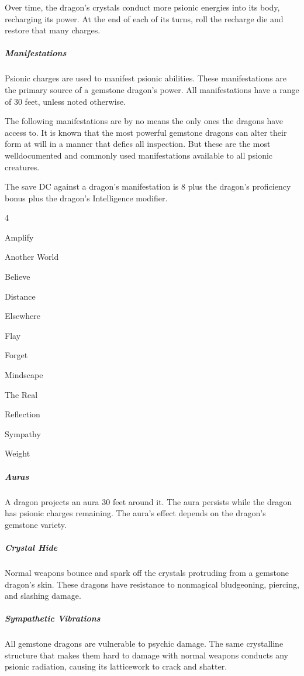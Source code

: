 \documentclass[10pt,a4paper,twoside,bg=print,twocolumn,openany,nodeprecatedcode]{dndbook}
\begin{document}
Over time, the dragon's crystals conduct more psionic energies into its body, recharging its power. At the end of each of its turns, roll the recharge die and restore that many charges.

\subparagraph{Manifestations}
Psionic charges are used to manifest psionic abilities. These manifestations are the primary source of a gemstone dragon's power. All manifestations have a range of 30 feet, unless noted otherwise.

The following manifestations are by no means the only ones the dragons have access to. It is known that the most powerful gemstone dragons can alter their form at will in a manner that defies all inspection. But these are the most welldocumented and commonly used manifestations available to all psionic creatures.

The save DC against a dragon's manifestation is 8 plus the dragon's proficiency bonus plus the dragon's Intelligence modifier.


\begin{itemize}
\begin{multicols}{4}
\item Amplify
\item Another World
\item Believe
\item Distance
\item Elsewhere
\item Flay
\item Forget
\item Mindscape
\item The Real
\item Reflection
\item Sympathy
\item Weight
\end{multicols}

\end{itemize}

\subparagraph{Auras}
A dragon projects an aura 30 feet around it. The aura persists while the dragon has psionic charges remaining. The aura's effect depends on the dragon's gemstone variety.

\subparagraph{Crystal Hide}
Normal weapons bounce and spark off the crystals protruding from a gemstone dragon's skin. These dragons have resistance to nonmagical bludgeoning, piercing, and slashing damage.

\subparagraph{Sympathetic Vibrations}
All gemstone dragons are vulnerable to psychic damage. The same crystalline structure that makes them hard to damage with normal weapons conducts any psionic radiation, causing its latticework to crack and shatter.
\end{document}
